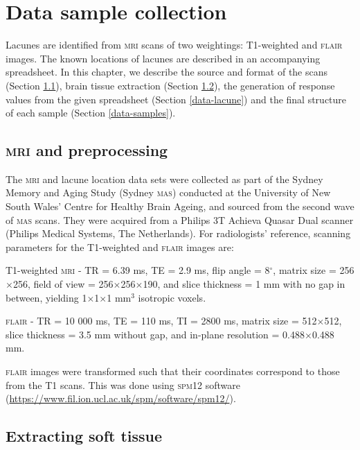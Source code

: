 %
%

\chapter{Data sample collection}\label{data}

Lacunes are identified from \textsc{mri} scans of two weightings: T1-weighted and \textsc{flair} images. The known locations of lacunes are described in an accompanying spreadsheet. In this chapter, we describe the source and format of the scans (Section \ref{data-mri}), brain tissue extraction (Section \ref{data-soft}), the generation of response values from the given spreadsheet (Section \ref{data-lacune}) and the final structure of each sample (Section \ref{data-samples}).

\section{\textsc{mri} and preprocessing}\label{data-mri}

The \textsc{mri} and lacune location data sets were collected as part of the Sydney Memory and Aging Study (Sydney \textsc{mas}) conducted at the University of New South Wales' Centre for Healthy Brain Ageing, and sourced from the second wave of \textsc{mas} scans. They were acquired from a Philips 3T Achieva Quasar Dual scanner (Philips Medical Systems, The Netherlands). For radiologists' reference, scanning parameters for the T1-weighted and \textsc{flair} images are:

T1-weighted \textsc{mri} - TR = 6.39 ms, TE = 2.9 ms, flip angle = 8$^\circ$, matrix size = 256$\times$256, field of view = 256$\times$256$\times$190, and slice thickness = 1 mm with no gap in between, yielding 1$\times$1$\times$1 mm$^3$ isotropic voxels.

\textsc{flair} - TR = 10 000 ms, TE = 110 ms, TI = 2800 ms, matrix size = 512$\times$512, slice thickness = 3.5 mm without gap, and in-plane resolution = 0.488$\times$0.488 mm.

\textsc{flair} images were transformed such that their coordinates correspond to those from the T1 scans. This was done using \textsc{spm12} software (\url{https://www.fil.ion.ucl.ac.uk/spm/software/spm12/}).

\section{Extracting soft tissue}\label{data-soft}

